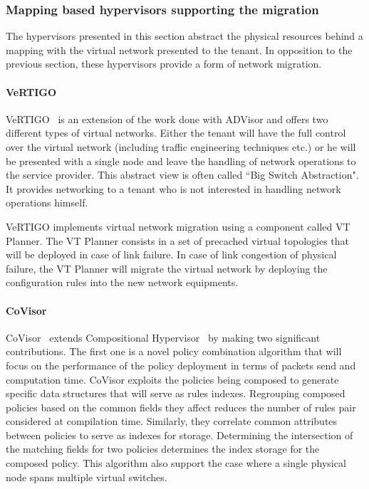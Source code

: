 \subsubsection{Mapping based hypervisors supporting the migration}
The hypervisors presented in this section abstract the physical resources behind a mapping with the virtual network presented to the tenant. In opposition to the previous section, these hypervisors provide a form of network migration. 

\paragraph{VeRTIGO}
VeRTIGO~\cite{VeRTIGO-Corin2012a} is an extension of the work done with ADVisor and offers two different types of virtual networks.
Either the tenant will have the full control over the virtual network (including traffic engineering techniques etc.) or he will be presented with a single node and leave the handling of network operations to the service provider.
This abstract view is often called ``Big Switch Abstraction".
It provides networking to a tenant who is not interested in handling network operations himself.

VeRTIGO implements virtual network migration using a component called VT Planner. The VT Planner consists in a set of precached virtual topologies that will be deployed in case of link failure. In case of link congestion of physical failure, the VT Planner will migrate the virtual network by deploying the configuration rules into the new network equipments.

\paragraph{CoVisor}
CoVisor~\cite{CoVisor-Jin2015} extends Compositional Hypervisor~\cite{CompositionalHypervisor-Jin2014} by making two significant contributions.
The first one is a novel policy combination algorithm that will focus on the performance of the policy deployment in terms of packets send and computation time.
CoVisor exploits the policies being composed to generate specific data structures that will serve as rules indexes.
Regrouping composed policies based on the common fields they affect reduces the number of rules pair considered at compilation time.
Similarly, they correlate common attributes between policies to serve as indexes for storage. Determining the intersection of the matching fields for two policies determines the index storage for the composed policy.
This algorithm also support the case where a single physical node spans multiple virtual switches.

